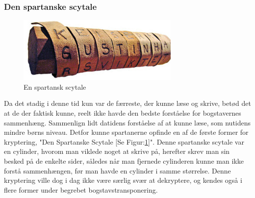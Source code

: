 \subsubsection{Den spartanske scytale}
\begin{figure}[H]
    \centering
    \includegraphics[scale=1.2]{Projectdoc/Problemanalyse/Illustrationer/scytale.jpg}
    \caption{En spartansk scytale}
    \label{fig:scytale}
\end{figure}
\noindent
Da det stadig i denne tid kun var de færreste, der kunne læse og skrive, betød det at de der faktisk kunne, reelt ikke havde den bedste forståelse for bogstavernes sammenhæng. Sammenlign lidt datidens forståelse af at kunne læse, som nutidens mindre børns niveau. Detfor kunne spartanerne opfinde en af de første former for kryptering, "Den Spartanske Scytale [Se Figur:\ref{fig:scytale}]". Denne spartanske scytale var en cylinder, hvorom man viklede noget at skrive på, herefter skrev man sin besked på de enkelte sider, således når man fjernede cylinderen kunne man ikke forstå sammenhængen, før man havde en cylinder i samme størrelse. Denne kryptering ville dog i dag ikke være særlig svær at dekryptere, og kendes også i flere former under begrebet bogstavstransponering.
